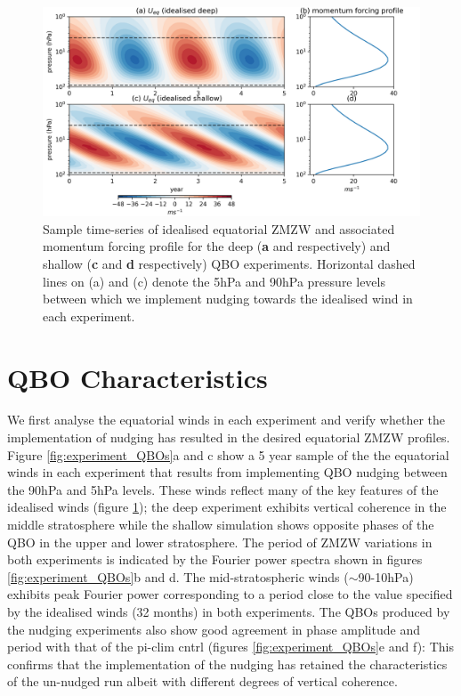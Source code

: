 \begin{figure}[h!]
\begin{center}
\noindent\includegraphics[width = \linewidth]{Figures/Figures-deepQBO/Idealised_QBO_features.png}
\caption[Idealised QBO winds used for nudging experiments]{Sample time-series of idealised equatorial ZMZW and associated momentum forcing profile for the deep (\textbf{a} and  respectively) and shallow (\textbf{c} and \textbf{d} respectively) QBO experiments. Horizontal dashed lines on (a) and (c) denote the 5hPa and 90hPa pressure levels between which we implement nudging towards the idealised wind in each experiment.}
\label{fig:Idealised_QBO_samples}
\end{center}
\end{figure}

\section{QBO Characteristics}
We first analyse the equatorial winds in each experiment and verify whether the implementation of nudging has resulted in the desired equatorial ZMZW profiles. Figure \ref{fig:experiment_QBOs}a and c show a 5 year sample of the the equatorial winds in each experiment that results from implementing QBO nudging between the 90hPa and 5hPa levels. These winds reflect many of the key features of the idealised winds (figure \ref{fig:Idealised_QBO_samples}); the deep experiment exhibits vertical coherence in the middle stratosphere while the shallow simulation shows opposite phases of the QBO in the upper and lower stratosphere. The period of ZMZW variations in both experiments is indicated by the Fourier power spectra shown in figures \ref{fig:experiment_QBOs}b and d. The mid-stratospheric winds ($\sim$90-10hPa) exhibits peak Fourier power corresponding to a period close to the value specified by the idealised winds (32 months) in both experiments. The QBOs produced by the nudging experiments also show good agreement in phase amplitude and period with that of the pi-clim cntrl (figures \ref{fig:experiment_QBOs}e and f): This confirms that the implementation of the nudging has retained the characteristics of the un-nudged run albeit with different degrees of vertical coherence.

